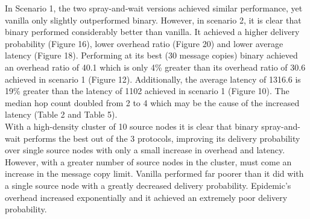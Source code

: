 \documentclass{article}
\begin{document}
\newline In Scenario 1, the two spray-and-wait versions achieved similar performance, yet vanilla only slightly outperformed binary. However, in scenario 2, it is clear that binary performed considerably better than vanilla. It achieved a higher delivery probability (Figure 16), lower overhead ratio (Figure 20) and lower average latency (Figure 18). Performing at its best (30 message copies) binary achieved an overhead ratio of 40.1 which is only 4\% greater than its overhead ratio of 30.6 achieved in scenario 1 (Figure 12). Additionally, the average latency of 1316.6 is 19\% greater than the latency of 1102 achieved in scenario 1 (Figure 10). The median hop count doubled from 2 to 4 which may be the cause of the increased latency (Table 2 and Table 5).\\
\newline With a high-density cluster of 10 source nodes it is clear that binary spray-and-wait performs the best out of the 3 protocols, improving its delivery probability over single source nodes with only a small increase in overhead and latency. However, with a greater number of source nodes in the cluster, must come an increase in the message copy limit. Vanilla performed far poorer than it did with a single source node with a greatly decreased delivery probability. Epidemic's overhead increased exponentially and it achieved an extremely poor delivery probability.

\end{document}
